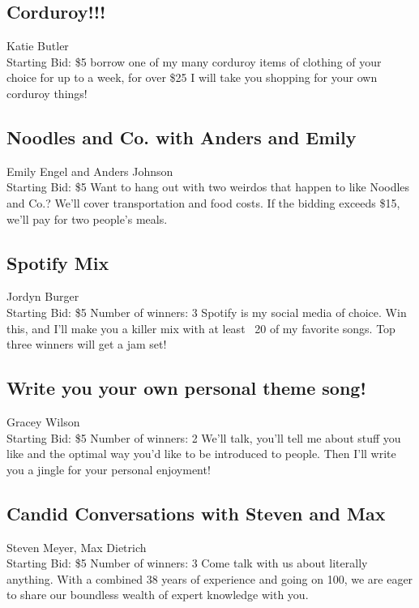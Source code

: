 \documentclass[11pt]{article}
\begin{document}
\subsection{Corduroy!!!}
Katie Butler
\\
Starting Bid: \$5
\newline
borrow one of my many corduroy items of clothing of your choice for up to a week, for over \$25 I will take you shopping for your own corduroy things!
\subsection{Noodles and Co. with Anders and Emily}
Emily Engel and Anders Johnson
\\
Starting Bid: \$5
\newline
Want to hang out with two weirdos that happen to like Noodles and Co.? We'll cover transportation and food costs. If the bidding exceeds \$15, we'll pay for two people's meals.
\subsection{Spotify Mix}
Jordyn Burger
\\
Starting Bid: \$5
\newline
Number of winners: 3
\newline
Spotify is my social media of choice. Win this, and I'll make you a killer mix with at least ~20 of my favorite songs. Top three winners will get a jam set!
\subsection{Write you your own personal theme song!}
Gracey Wilson
\\
Starting Bid: \$5
\newline
Number of winners: 2
\newline
We'll talk, you'll tell me about stuff you like and the optimal way you'd like to be introduced to people. Then I'll write you a jingle for your personal enjoyment!
\subsection{Candid Conversations with Steven and Max}
Steven Meyer, Max Dietrich
\\
Starting Bid: \$5
\newline
Number of winners: 3
\newline
Come talk with us about literally anything. With a combined 38 years of experience and going on 100, we are eager to share our boundless wealth of expert knowledge with you.
\end{document}
